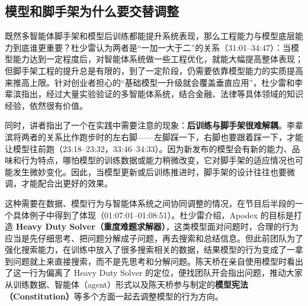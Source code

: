 \documentclass[UTF8,a4paper,11pt,fontset=fandol]{ctexart}
\begin{document}
\subsection{模型和脚手架为什么要交替调整}
既然多智能体脚手架和模型后训练都能提升系统表现，那么工程能力与模型底层能力到底谁更重要？杜少雷认为两者是“一加一大于二”的关系（31:01–34:47）：当模型能力达到一定程度后，对智能体系统做一些工程优化，就能大幅提高整体表现；但脚手架工程的提升总是有限的，到了一定阶段，仍需要依靠模型能力的实质提高来推高上限。针对创业者担心的“基础模型一升级就会覆盖垂直应用”，杜少雷和李辈滨指出，经过大量实验验证的多智能体系统，结合金融、法律等具体领域的知识经验，依然很有价值。

同时，讲者指出了一个在实践中需要注意的现象：\textbf{后训练与脚手架很难解耦}。李辈滨将两者的关系比作跑步时的左右脚——左脚踩一下，右脚也要跟着踩一下，才能让模型往前跑（23:18–23:32，33:46–34:33）。因为新发布的模型会有新的能力、品味和行为特点，哪怕模型的训练数据或能力稍微改变，它对脚手架的适应情况也可能发生微妙变化。因此，当模型更新或后训练推进时，脚手架的设计往往也要微调，才能配合出更好的效果。

这种需要在数据、模型行为与智能体系统之间协同调整的情况，在节目后半段的一个具体例子中得到了体现（01:07:01–01:08:51）。杜少雷介绍，Apodex 的目标是打造 \textbf{Heavy Duty Solver（重度难题求解器）}，这类模型面对问题时，合理的行为应当是先仔细思考、把问题分解成子问题，再去搜索和总结信息。但此前团队为了强化搜索能力，在训练中放入了很多搜索相关的数据，结果模型的行为变成了一拿到问题就上来直接搜索，而不是先思考和分解问题。陈天桥在亲自使用模型时看出了这一行为偏离了 Heavy Duty Solver 的定位，便找团队开会指出问题，推动大家从训练数据、智能体（agent）形式以及陈天桥参与制定的\textbf{模型宪法（Constitution）}等多个方面一起去调整模型的行为方向。
\end{document}
